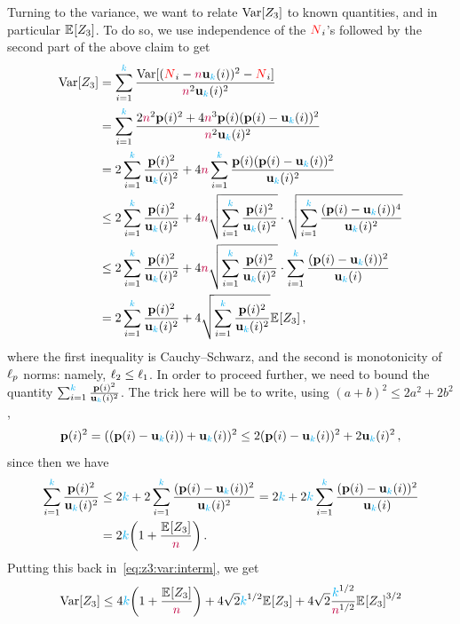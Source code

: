 Turning to the variance, we want to relate $\Var[Z_3]$ to known quantities, and in particular $\bEE{Z_3}$. To do so, we use independence of the $\occur_i$'s followed by the second part of the above claim to get
\begin{align}
    \Var[Z_3]
    &= \sum_{i=1}^\ab \frac{\Var[(\occur_i-\ns\uniform_\ab(i))^2- \occur_i]}{\ns^2\uniform_\ab(i)^2} \notag\\
    &= \sum_{i=1}^\ab \frac{2\ns^2\p(i)^2 + 4\ns^3\p(i)(\p(i)-\uniform_\ab(i))^2}{\ns^2\uniform_\ab(i)^2} \notag\\
    &= 2\sum_{i=1}^\ab \frac{\p(i)^2}{\uniform_\ab(i)^2}+4\ns\sum_{i=1}^\ab \frac{\p(i)(\p(i)-\uniform_\ab(i))^2}{\uniform_\ab(i)^2}\notag\\
    &\leq 2\sum_{i=1}^\ab \frac{\p(i)^2}{\uniform_\ab(i)^2}+4\ns\sqrt{\sum_{i=1}^\ab \frac{\p(i)^2}{\uniform_\ab(i)^2}}\cdot\sqrt{\sum_{i=1}^\ab \frac{(\p(i)-\uniform_\ab(i))^4}{\uniform_\ab(i)^2}}\notag\\
    &\leq 2\sum_{i=1}^\ab \frac{\p(i)^2}{\uniform_\ab(i)^2}+4\ns\sqrt{\sum_{i=1}^\ab \frac{\p(i)^2}{\uniform_\ab(i)^2}}\cdot\sum_{i=1}^\ab \frac{(\p(i)-\uniform_\ab(i))^2}{\uniform_\ab(i)}\notag\\
    &= 2\sum_{i=1}^\ab \frac{\p(i)^2}{\uniform_\ab(i)^2} + 4\sqrt{\sum_{i=1}^\ab \frac{\p(i)^2}{\uniform_\ab(i)^2}}\bEE{Z_3} \label{eq:z3:var:interm}\,,
\end{align}
where the first inequality is Cauchy--Schwarz, and the second is monotonicity of $\lp[p]$ norms: namely, $\lp[2] \leq \lp[1]$. In order to proceed further, we need to bound the quantity $\sum_{i=1}^\ab \frac{\p(i)^2}{\uniform_\ab(i)^2}$. The trick here will be to write, using $(a+b)^2 \leq 2a^2+2b^2$, 
\[
    \p(i)^2 = ((\p(i)-\uniform_\ab(i))+\uniform_\ab(i))^2 \leq 2(\p(i)-\uniform_\ab(i))^2 + 2\uniform_\ab(i)^2\,,
\]
since then we have
\begin{align*}
    \sum_{i=1}^\ab \frac{\p(i)^2}{\uniform_\ab(i)^2}
    &\leq 2\ab + 2\sum_{i=1}^\ab \frac{(\p(i)-\uniform_\ab(i))^2}{\uniform_\ab(i)^2}  
    = 2\ab + 2\ab\sum_{i=1}^\ab \frac{(\p(i)-\uniform_\ab(i))^2}{\uniform_\ab(i)} \\
    &= 2\ab\Paren{ 1 + \frac{\bEE{Z_3}}{\ns}  }\,.
\end{align*}
Putting this back in~\cref{eq:z3:var:interm}, we get
\begin{equation}
    \Var[Z_3]
    \leq 4\ab\Paren{ 1 + \frac{\bEE{Z_3}}{\ns}  } + 4\sqrt{2}\ab^{1/2}\bEE{Z_3}+4\sqrt{2}\frac{\ab^{1/2}}{\ns^{1/2}} \bEE{Z_3}^{3/2} \label{eq:z3:var}
\end{equation}
